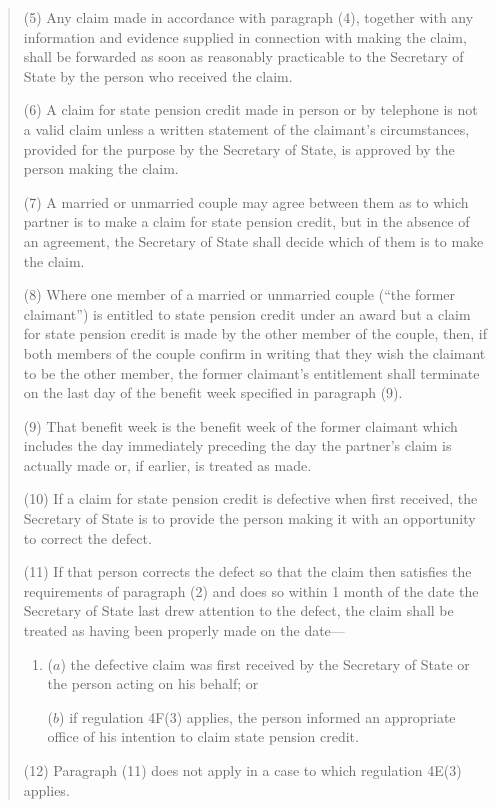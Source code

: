 \documentclass[12pt,a4paper]{article}
\begin{document}
\begin{quotation}
(5) Any claim made in accordance with paragraph (4), together with any information and evidence supplied in connection with making the claim, shall be forwarded as soon as reasonably practicable to the Secretary of State by the person who received the claim.

(6) A claim for state pension credit made in person or by telephone is not a valid claim unless a written statement of the claimant’s circumstances, provided for the purpose by the Secretary of State, is approved by the person making the claim.

(7) A married or unmarried couple may agree between them as to which partner is to make a claim for state pension credit, but in the absence of an agreement, the Secretary of State shall decide which of them is to make the claim.

(8) Where one member of a married or unmarried couple (“the former claimant”) is entitled to state pension credit under an award but a claim for state pension credit is made by the other member of the couple, then, if both members of the couple confirm in writing that they wish the claimant to be the other member, the former claimant’s entitlement shall terminate on the last day of the benefit week specified in paragraph (9).

(9) That benefit week is the benefit week of the former claimant which includes the day immediately preceding the day the partner’s claim is actually made or, if earlier, is treated as made.

(10) If a claim for state pension credit is defective when first received, the Secretary of State is to provide the person making it with an opportunity to correct the defect.

(11) If that person corrects the defect so that the claim then satisfies the requirements of paragraph (2) and does so within 1 month of the date the Secretary of State last drew attention to the defect, the claim shall be treated as having been properly made on the date—
\begin{enumerate}\item[]
($a$) the defective claim was first received by the Secretary of State or the person acting on his behalf; or

($b$) if regulation 4F(3) applies, the person informed an appropriate office of his intention to claim state pension credit.
\end{enumerate}

(12) Paragraph (11) does not apply in a case to which regulation 4E(3) applies.


\end{quotation}
\end{document}
